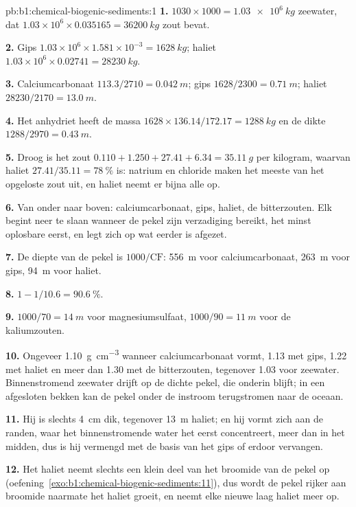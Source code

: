 \begin{solution}{pb:b1:chemical-biogenic-sediments:1}
\textbf{1.} $1030\times1000 = \qty{1.03e6}{kg}$ zeewater, dat
$1.03\times10^6\times0.035165 = \qty{36200}{kg}$ zout bevat.

\textbf{2.} Gips $1.03\times10^6\times1.581\times10^{-3} = \qty{1628}{kg}$;
haliet $1.03\times10^6\times0.02741 = \qty{28230}{kg}$.

\textbf{3.} Calciumcarbonaat $113.3/2710 = \qty{0.042}{m}$; gips $1628/2300 =
\qty{0.71}{m}$; haliet $28230/2170 = \qty{13.0}{m}$.

\textbf{4.} Het anhydriet heeft de massa $1628\times136.14/172.17 =
\qty{1288}{kg}$ en de dikte $1288/2970 = \qty{0.43}{m}$.

\textbf{5.} Droog is het zout $0.110 + 1.250 + 27.41 + 6.34 = \qty{35.11}{g}$ per
kilogram, waarvan haliet $27.41/35.11 = \qty{78}{\%}$ is: natrium en chloride
maken het meeste van het opgeloste zout uit, en haliet neemt er bijna alle op.

\textbf{6.} Van onder naar boven: calciumcarbonaat, gips, haliet, de bitterzouten.
Elk  begint neer te slaan wanneer de pekel zijn verzadiging bereikt, het minst oplosbare
eerst, en legt zich op wat eerder is afgezet.

\textbf{7.} De diepte van de pekel is $1000/\mathrm{CF}$: \qty{556}{m} voor calciumcarbonaat,
\qty{263}{m} voor gips, \qty{94}{m} voor haliet.

\textbf{8.} $1 - 1/10.6 = \qty{90.6}{\%}$.

\textbf{9.} $1000/70 = \qty{14}{m}$ voor magnesiumsulfaat, $1000/90 = \qty{11}{m}$
voor de kaliumzouten.

\textbf{10.} Ongeveer \qty{1.10}{g.cm^{-3}} wanneer calciumcarbonaat vormt, 1.13 met
gips, 1.22 met haliet en meer dan 1.30 met de bitterzouten, tegenover 1.03 voor
zeewater. Binnenstromend zeewater drijft op de dichte pekel, die onderin blijft; in een
afgesloten bekken kan de pekel onder de instroom terugstromen naar de oceaan.

\textbf{11.} Hij is slechts \qty{4}{cm} dik, tegenover \qty{13}{m} haliet; en hij
vormt zich aan de randen, waar het binnenstromende water het eerst concentreert, meer dan
in het midden, dus is hij vermengd met de basis van het gips of erdoor vervangen.

\textbf{12.} Het haliet neemt slechts een klein deel van het broomide van de pekel op
(oefening~\ref{exo:b1:chemical-biogenic-sediments:11}), dus wordt de pekel
rijker aan broomide naarmate het haliet groeit, en neemt elke nieuwe laag haliet meer op.


\end{solution}
